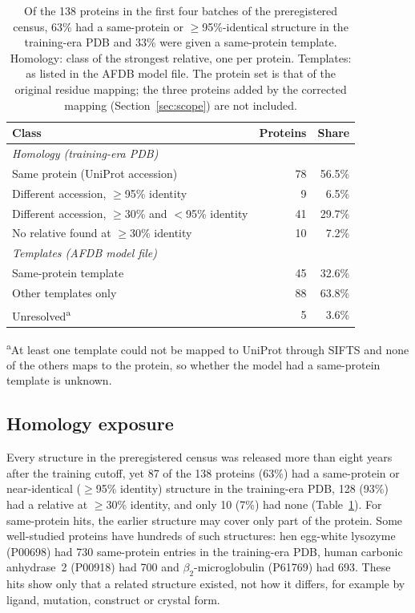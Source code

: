 \documentclass{article}
\begin{document}
\begin{table}[tbp]
\centering
\caption{Of the 138 proteins in the first four batches of the preregistered
census, 63\% had a same-protein or $\ge$95\%-identical structure in the
training-era PDB and 33\% were given a same-protein template. Homology:
class of the strongest relative, one per protein. Templates: as listed in
the AFDB model file. The protein set is that of the original residue
mapping; the three proteins added by the corrected mapping
(Section~\ref{sec:scope}) are not included.}
\label{tab:homology}
\begin{tabular}{lrr}
\toprule
Class & Proteins & Share \\
\midrule
\multicolumn{3}{l}{\emph{Homology (training-era PDB)}}\\
Same protein (UniProt accession) & 78 & 56.5\% \\
Different accession, $\ge$95\% identity & 9 & 6.5\% \\
Different accession, $\ge$30\% and $<$95\% identity & 41 & 29.7\% \\
No relative found at $\ge$30\% identity & 10 & 7.2\% \\
\midrule
\multicolumn{3}{l}{\emph{Templates (AFDB model file)}}\\
Same-protein template & 45 & 32.6\% \\
Other templates only & 88 & 63.8\% \\
Unresolved\textsuperscript{a} & 5 & 3.6\% \\
\bottomrule
\end{tabular}

\smallskip
\footnotesize \textsuperscript{a}At least one template could not be mapped
to UniProt through SIFTS and none of the others maps to the protein, so
whether the model had a same-protein template is unknown.
\end{table}

\subsection{Homology exposure}
\label{sec:homexp}

Every structure in the preregistered census was released more than eight years after the
training cutoff, yet 87 of the 138 proteins (63\%) had a same-protein or
near-identical ($\ge$95\% identity) structure in the training-era PDB, 128
(93\%) had a relative at $\ge$30\% identity, and only 10 (7\%) had none
(Table~\ref{tab:homology}). For same-protein hits, the earlier structure may
cover only part of the protein. Some well-studied proteins have hundreds of
such structures: hen egg-white lysozyme (P00698) had 730 same-protein
entries in the training-era PDB, human carbonic anhydrase~2 (P00918) had 700
and $\beta_2$-microglobulin (P61769) had 693. These hits show only that a
related structure existed, not how it differs, for example by ligand,
mutation, construct or crystal form.
\end{document}
